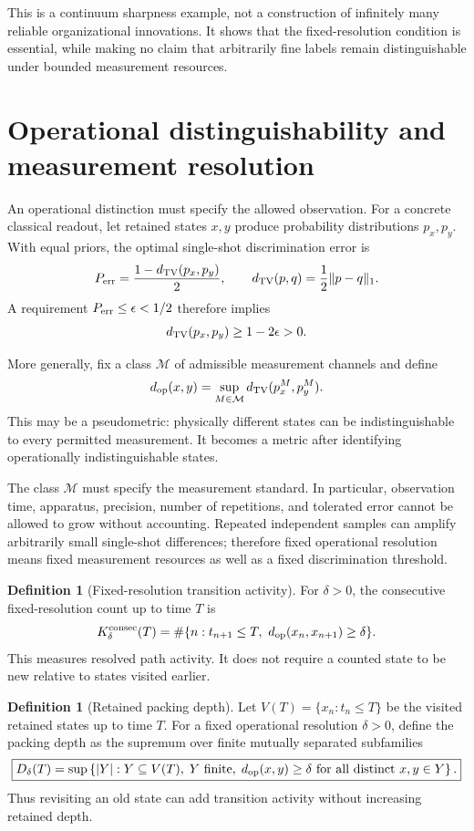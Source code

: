 \documentclass[11pt,a4paper]{article}
\theoremstyle{definition}
\newtheorem{definition}[theorem]{Definition}
\numberwithin{equation}{section}
\begin{document}
This is a continuum sharpness example, not a construction of
infinitely many reliable organizational innovations. It shows that
the fixed-resolution condition is essential, while making no claim
that arbitrarily fine labels remain distinguishable under bounded
measurement resources.


\section{Operational distinguishability and measurement resolution}

An operational distinction must specify the allowed observation.
For a concrete classical readout, let retained states $x,y$
produce probability distributions $p_x,p_y$. With equal priors,
the optimal single-shot discrimination error is
\begin{equation}
P_{\rm err}
=
\frac{1-d_{\rm TV}(p_x,p_y)}{2},
\qquad
d_{\rm TV}(p,q)=\frac12\|p-q\|_1.
\label{eq:discrimination}
\end{equation}
A requirement $P_{\rm err}\le\epsilon<1/2$ therefore implies
\[
d_{\rm TV}(p_x,p_y)\ge1-2\epsilon>0.
\]

More generally, fix a class $\mathcal M$ of admissible measurement
channels and define
\[
d_{\rm op}(x,y)
=
\sup_{M\in\mathcal M}
d_{\rm TV}(p_x^M,p_y^M).
\]
This may be a pseudometric: physically different states can be
indistinguishable to every permitted measurement. It becomes a
metric after identifying operationally indistinguishable states.

The class $\mathcal M$ must specify the measurement standard. In
particular, observation time, apparatus, precision, number of repetitions,
and tolerated error cannot be allowed to grow without accounting. Repeated
independent samples can amplify arbitrarily small single-shot differences;
therefore fixed operational resolution means fixed measurement resources
as well as a fixed discrimination threshold.

\begin{definition}[Fixed-resolution transition activity]
For $\delta>0$, the consecutive fixed-resolution count up to time $T$ is
\[
K_\delta^{\rm consec}(T)
=
\#\{n:t_{n+1}\le T,\ d_{\rm op}(x_n,x_{n+1})\ge\delta\}.
\]
This measures resolved path activity. It does not require a counted state to
be new relative to states visited earlier.
\end{definition}

\begin{definition}[Retained packing depth]
Let $V(T)=\{x_n:t_n\le T\}$ be the visited retained states up to time $T$.
For a fixed operational resolution $\delta>0$, define the packing depth as
the supremum over finite mutually separated subfamilies
\begin{equation}
\boxed{
D_\delta(T)
=
\sup\left\{
|Y|:Y\subseteq V(T),\;Y\text{ finite},\;
d_{\rm op}(x,y)\ge\delta
\text{ for all distinct }x,y\in Y
\right\}.
}
\label{eq:packing-depth}
\end{equation}
Thus revisiting an old state can add transition activity without increasing
retained depth.
\end{definition}
\end{document}
